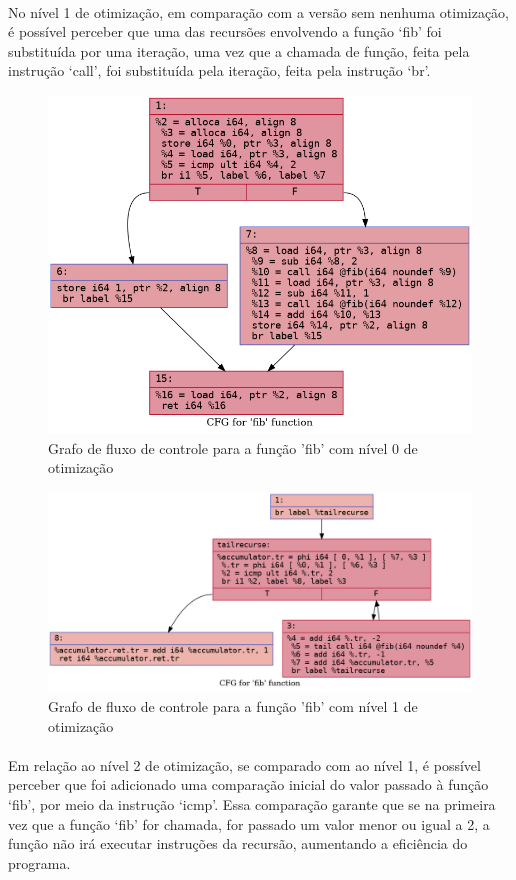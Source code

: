 \documentclass[12pt]{article}
\begin{document}
\paragraph{}No nível 1 de otimização, em comparação com a versão sem nenhuma otimização, é possível perceber que uma das recursões envolvendo a função ‘fib’ foi substituída por uma iteração, uma vez que a chamada de função, feita pela instrução ‘call’, foi substituída pela iteração, feita pela instrução ‘br’.

\begin{figure}
    \centering
    \includegraphics[width=0.5\linewidth]{fib2_.fib_O0.png}
    \caption{Grafo de fluxo de controle para a função 'fib' com nível 0 de otimização}
\end{figure}

\begin{figure}
    \centering
    \includegraphics[width=0.5\linewidth]{fib2_.fib_O1.png}
    \caption{Grafo de fluxo de controle para a função 'fib' com nível 1 de otimização}
\end{figure}

\paragraph{}Em relação ao nível 2 de otimização, se comparado com ao nível 1, é possível perceber que foi adicionado uma comparação inicial do valor passado à função ‘fib’, por meio da instrução ‘icmp’. Essa comparação garante que se na primeira vez que a função ‘fib’ for chamada, for passado um valor menor ou igual a 2, a função não irá executar instruções da recursão, aumentando a eficiência do programa.
\end{document}
